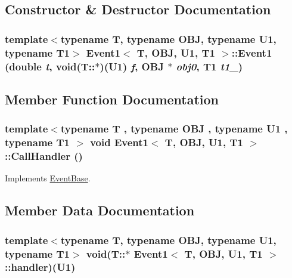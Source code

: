 \subsection{Constructor \& Destructor Documentation}
\hypertarget{classEvent1_e53edac1393d2f7920f936ba6c7f90ba}{
\subsubsection[{Event1}]{\setlength{\rightskip}{0pt plus 5cm}template$<$typename T, typename OBJ, typename U1, typename T1$>$ {\bf Event1}$<$ T, OBJ, U1, T1 $>$::{\bf Event1} (double {\em t}, \/  void(T::$\ast$)(U1) {\em f}, \/  OBJ $\ast$ {\em obj0}, \/  T1 {\em t1\_})}}
\label{classEvent1_e53edac1393d2f7920f936ba6c7f90ba}




\subsection{Member Function Documentation}
\hypertarget{classEvent1_6d7e716e16ab6ee6672807250860cdd8}{
\subsubsection[{CallHandler}]{\setlength{\rightskip}{0pt plus 5cm}template$<$typename T , typename OBJ , typename U1 , typename T1 $>$ void {\bf Event1}$<$ T, OBJ, U1, T1 $>$::CallHandler ()}}
\label{classEvent1_6d7e716e16ab6ee6672807250860cdd8}




Implements \hyperlink{classEventBase_121ca64dec88c8d9589c064b0060d037}{EventBase}.

\subsection{Member Data Documentation}
\hypertarget{classEvent1_2a02ab5cbd37a2879c3db25cf3faf80f}{
\subsubsection[{handler}]{\setlength{\rightskip}{0pt plus 5cm}template$<$typename T, typename OBJ, typename U1, typename T1$>$ void(T::$\ast$ {\bf Event1}$<$ T, OBJ, U1, T1 $>$::{\bf handler})(U1)}}
\label{classEvent1_2a02ab5cbd37a2879c3db25cf3faf80f}


